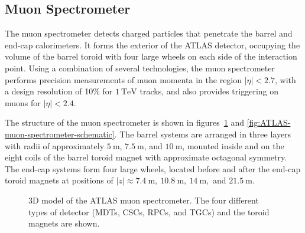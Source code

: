 \subsection{Muon Spectrometer}\label{sec:ATLAS-muon-spectrometer}
The muon spectrometer detects charged particles that penetrate the barrel and end-cap calorimeters. It forms the exterior of the ATLAS detector, occupying the volume of the barrel toroid with four large wheels on each side of the interaction point. Using a combination of several technologies, the muon spectrometer performs precision measurements of muon momenta in the region $|\eta|<2.7$, with a design resolution of 10\% for $\SI{1}{\tera\electronvolt}$ tracks, and also provides triggering on muons for $|\eta|<2.4$. 

The structure of the muon spectrometer is shown in figures~\ref{fig:ATLAS-muon-spectrometer-layout} and \ref{fig:ATLAS-muon-spectrometer-schematic}. The barrel systems are arranged in three layers with radii of approximately $\SI{5}{\meter}$, $\SI{7.5}{\meter}$, and $\SI{10}{\meter}$, mounted inside and on the eight coils of the barrel toroid magnet with approximate octagonal symmetry. The end-cap systems form four large wheels, located before and after the end-cap toroid magnets at positions of $|z|\approx \SI{7.4}{\meter},\ \SI{10.8}{\meter},\ \SI{14}{\meter},$ and $\SI{21.5}{\meter}$. 

\begin{figure}[htbp]
	\centering
	\caption{3D model of the ATLAS muon spectrometer. The four different types of detector (MDTs, CSCs, RPCs, and TGCs) and the toroid magnets are shown.}
	\label{fig:ATLAS-muon-spectrometer-layout}
\end{figure}

